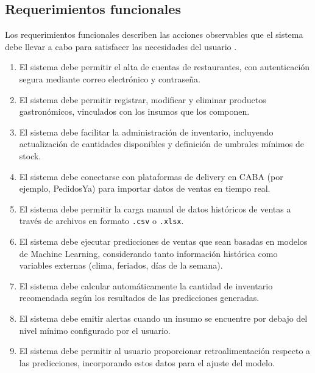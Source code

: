 \subsection{Requerimientos funcionales}\label{sec:requerimientos-funcionales}
Los requerimientos funcionales describen las acciones observables que el sistema debe llevar a cabo para satisfacer las necesidades del usuario \parencite{ieee2008}.
\begin{enumerate}[label=\textbf{RF\arabic*}, leftmargin=2.5cm]
    \item El sistema debe permitir el alta de cuentas de restaurantes, con autenticación segura mediante correo electrónico y contraseña.
    \item El sistema debe permitir registrar, modificar y eliminar productos gastronómicos, vinculados con los insumos que los componen.
    \item El sistema debe facilitar la administración de inventario, incluyendo actualización de cantidades disponibles y definición de umbrales mínimos de stock.
    \item El sistema debe conectarse con plataformas de delivery en CABA (por ejemplo, PedidosYa) para importar datos de ventas en tiempo real.
    \item El sistema debe permitir la carga manual de datos históricos de ventas a través de archivos en formato \texttt{.csv} o \texttt{.xlsx}.
    \item El sistema debe ejecutar predicciones de ventas que sean basadas en modelos de Machine Learning, considerando tanto información histórica como variables externas (clima, feriados, días de la semana).
    \item El sistema debe calcular automáticamente la cantidad de inventario recomendada según los resultados de las predicciones generadas.
    \item El sistema debe emitir alertas cuando un insumo se encuentre por debajo del nivel mínimo configurado por el usuario.
    \item El sistema debe permitir al usuario proporcionar retroalimentación respecto a las predicciones, incorporando estos datos para el ajuste del modelo.
\end{enumerate}

